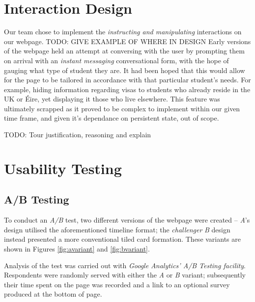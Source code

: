 \documentclass[a4paper, notoc]{tufte-handout}
\begin{document}
%

\section{Interaction Design}\label{label:interaction-design}

Our team chose to implement the \textit{instructing and manipulating} interactions on our 
webpage. TODO: GIVE EXAMPLE OF WHERE IN DESIGN Early versions of the webpage held an attempt 
at conversing with the user by prompting them on arrival with an \textit{instant messaging} 
conversational form, with the hope of gauging what type of student they are. It had been 
hoped that this would allow for the page to be tailored in accordance with that particular 
student's needs. For example, hiding information regarding visas to students who already 
reside in the UK or Éire, yet displaying it those who live elsewhere. This feature was 
ultimately scrapped as it proved to be complex to implement within our given time frame, and 
given it's dependance on persistent state, out of scope.

TODO: Tour justification, reasoning and explain

\section{Usability Testing}\label{sec:usability-testing}

\subsection{A/B Testing}\label{subsec:a-b-testing}

To conduct an \textit{A/B} test, two different versions of the webpage were created -- 
\textit{A}'s design utilised the aforementioned timeline format; the \textit{challenger} 
\textit{B} design instead presented a more conventional tiled card formation. These variants 
are shown in Figures \ref{fig:avariant} and \ref{fig:bvariant}.

Analysis of the test was carried out with \textit{Google Analytics' A/B Testing facility}. 
Respondents were randomly served with either the \textit{A} or \textit{B} variant; subsequently 
their time spent on the page was recorded and a link to an optional survey produced at the bottom of page.
\end{document}
